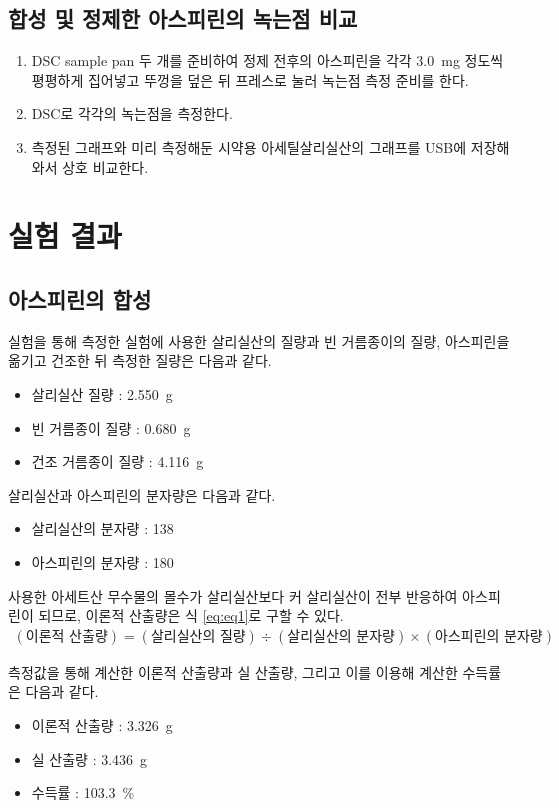 \documentclass{GSHS-chemexp}
\begin{document}
	\subsection{합성 및 정제한 아스피린의 녹는점 비교}
	\begin{enumerate}
		\item DSC sample pan 두 개를 준비하여 정제 전후의 아스피린을
		각각 \SI{3.0}{\milli\gram} 정도씩 평평하게 집어넣고
		뚜껑을 덮은 뒤 프레스로 눌러 녹는점 측정 준비를 한다.
		\item DSC로 각각의 녹는점을 측정한다.
		\item 측정된 그래프와 미리 측정해둔 시약용 아세틸살리실산의 그래프를
		USB에 저장해 와서 상호 비교한다.
	\end{enumerate}
	
	\section{실험 결과}
	
	\subsection{아스피린의 합성}
	실험을 통해 측정한 실험에 사용한 살리실산의 질량과 빈 거름종이의 질량,
	아스피린을 옮기고 건조한 뒤 측정한 질량은 다음과 같다.
	\begin{itemize}
		\item 살리실산 질량 : \SI{2.550}{\gram}
		\item 빈 거름종이 질량 : \SI{0.680}{\gram}
		\item 건조 거름종이 질량 : \SI{4.116}{\gram}
	\end{itemize}
	
	살리실산과 아스피린의 분자량은 다음과 같다.
	\begin{itemize}
		\item 살리실산의 분자량 : 138
		\item 아스피린의 분자량 : 180
	\end{itemize}
	
	사용한 아세트산 무수물의 몰수가 살리실산보다 커
	살리실산이 전부 반응하여 아스피린이 되므로, 이론적 산출량은
	식 \ref{eq:eq1}로 구할 수 있다.
	\begin{gather}
		(\text{이론적 산출량}) = (\text{살리실산의 질량})
		\div (\text{살리실산의 분자량}) \times (\text{아스피린의 분자량})
		\label{eq:eq1}
	\end{gather}
	
	측정값을 통해 계산한 이론적 산출량과 실 산출량, 그리고 이를 이용해 계산한
	수득률은 다음과 같다.
	\begin{itemize}
		\item 이론적 산출량 : \SI{3.326}{\gram}
		\item 실 산출량 : \SI{3.436}{\gram}
		\item 수득률 : \SI{103.3}{\percent}
	\end{itemize}
	
\end{document}
